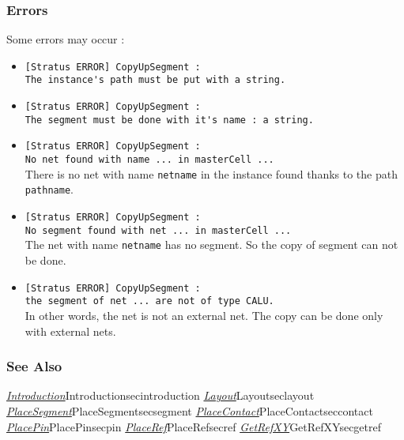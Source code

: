 \subsubsection{Errors}
    
Some errors may occur :
\begin{itemize}
    \item \verb-[Stratus ERROR] CopyUpSegment :-\\\verb-The instance's path must be put with a string.-
    \item \verb-[Stratus ERROR] CopyUpSegment :-\\\verb-The segment must be done with it's name : a string.-
    \item \verb-[Stratus ERROR] CopyUpSegment :-\\\verb-No net found with name ... in masterCell ...-\\There is no net with name \verb-netname- in the instance found thanks to the path \verb-pathname-.
    \item \verb-[Stratus ERROR] CopyUpSegment :-\\\verb-No segment found with net ... in masterCell ...-\\The net with name \verb-netname- has no segment. So the copy of segment can not be done.
    \item \verb-[Stratus ERROR] CopyUpSegment :-\\\verb-the segment of net ... are not of type CALU.-\\In other words, the net is not an external net. The copy can be done only with external nets.
\end{itemize}

\begin{htmlonly}

\subsubsection{See Also}

\hyperref[ref]{\emph{Introduction}}{}{Introduction}{secintroduction}
\hyperref[ref]{\emph{Layout}}{}{Layout}{seclayout}
\hyperref[ref]{\emph{PlaceSegment}}{}{PlaceSegment}{secsegment}
\hyperref[ref]{\emph{PlaceContact}}{}{PlaceContact}{seccontact}
\hyperref[ref]{\emph{PlacePin}}{}{PlacePin}{secpin}
\hyperref[ref]{\emph{PlaceRef}}{}{PlaceRef}{secref}
\hyperref[ref]{\emph{GetRefXY}}{}{GetRefXY}{secgetref}

\end{htmlonly}
